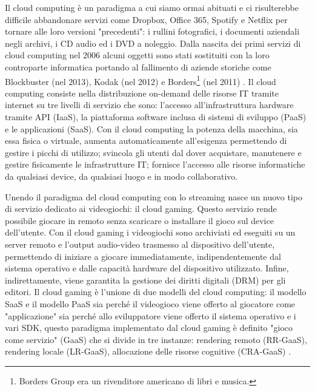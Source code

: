 Il cloud computing è un paradigma a cui siamo ormai abituati e ci risulterebbe difficile abbandonare servizi come Dropbox, Office 365, Spotify e Netflix per tornare alle loro versioni "precedenti": i rullini fotografici, i documenti aziendali negli archivi, i CD audio ed i DVD a noleggio. Dalla nascita dei primi servizi di cloud computing nel 2006 alcuni oggetti sono stati sostituiti con la loro controparte informatica portando al fallimento di aziende storiche come Blockbuster (nel 2013), Kodak (nel 2012) e Borders\footnote{Borders Group era un rivenditore americano di libri e musica.} (nel 2011) \parencite{I_4_fallimenti_più_clamorosi_del_decennio}. Il cloud computing consiste nella distribuzione on-demand delle risorse IT tramite internet su tre livelli di servizio che sono: l'accesso all'infrastruttura hardware tramite API (IaaS), la piattaforma software inclusa di sistemi di sviluppo (PaaS) e le applicazioni (SaaS). Con il cloud computing la potenza della macchina, sia essa fisica o virtuale, aumenta automaticamente all'esigenza permettendo di gestire i picchi di utilizzo; svincola gli utenti dal dover acquistare, manutenere e gestire fisicamente le infrastrutture IT; fornisce l'accesso alle risorse informatiche da qualsiasi device, da qualsiasi luogo e in modo collaborativo.

Unendo il paradigma del cloud computing con lo streaming nasce un nuovo tipo di servizio dedicato ai videogiochi: il cloud gaming. Questo servizio rende possibile giocare in remoto senza scaricare o installare il gioco sul device dell'utente. Con il cloud gaming i videogiochi sono archiviati ed eseguiti su un server remoto e l'output audio-video trasmesso al dispositivo dell'utente, permettendo di iniziare a giocare immediatamente, indipendentemente dal sistema operativo e dalle capacità hardware del dispositivo utilizzato. Infine, indirettamente, viene garantita la gestione dei diritti digitali (DRM) per gli editori. Il cloud gaming è l'unione di due modelli del cloud computing: il modello SaaS e il modello PaaS sia perché il videogioco viene offerto al giocatore come "applicazione" sia perché allo sviluppatore viene offerto il sistema operativo e i vari SDK, questo paradigma implementato dal cloud gaming è definito "gioco come servizio" (GaaS) che si divide in tre instanze: rendering remoto (RR-GaaS), rendering locale (LR-GaaS), allocazione delle risorse cognitive (CRA-GaaS) \parencite{Cloud_for_Gaming}.



